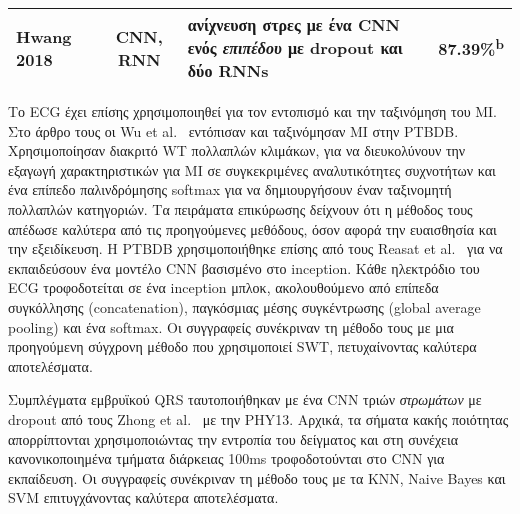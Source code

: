 \begin{sidewaystable}
\begin{tabular}{l c l l}
		Hwang 2018~\cite{hwang2018deep}        & CNN, RNN        & ανίχνευση στρες με ένα CNN  ενός \textit{επιπέδου} με dropout και δύο RNNs                   & 87.39\%\textsuperscript{b}                                                                                                                                                                                                                                                                                                                                                                                                                                                                                                                                                                                                                                                                                                                                                                                                                                                  \\
		\bottomrule
	\end{tabular}
\end{sidewaystable}

Το ECG έχει επίσης χρησιμοποιηθεί για τον εντοπισμό και την ταξινόμηση του ΜΙ.
Στο άρθρο τους οι Wu et al.~\cite{wu2016myocardial} εντόπισαν και ταξινόμησαν MI στην PTBDB\@.
Χρησιμοποίησαν διακριτό WT πολλαπλών κλιμάκων, για να διευκολύνουν την εξαγωγή χαρακτηριστικών για ΜΙ σε συγκεκριμένες αναλυτικότητες συχνοτήτων και ένα επίπεδο παλινδρόμησης softmax για να δημιουργήσουν έναν ταξινομητή πολλαπλών κατηγοριών.
Τα πειράματα επικύρωσης δείχνουν ότι η μέθοδος τους απέδωσε καλύτερα από τις προηγούμενες μεθόδους, όσον αφορά την ευαισθησία και την εξειδίκευση.
Η PTBDB χρησιμοποιήθηκε επίσης από τους Reasat et al.~\cite{reasat2017detection} για να εκπαιδεύσουν ένα μοντέλο CNN βασισμένο στο inception.
Κάθε ηλεκτρόδιο του ECG τροφοδοτείται σε ένα inception μπλοκ, ακολουθούμενο από επίπεδα συγκόλλησης (concatenation), παγκόσμιας μέσης συγκέντρωσης (global average pooling) και ένα softmax.
Οι συγγραφείς συνέκριναν τη μέθοδο τους με μια προηγούμενη σύγχρονη μέθοδο που χρησιμοποιεί SWT, πετυχαίνοντας καλύτερα αποτελέσματα.

Συμπλέγματα εμβρυϊκού QRS ταυτοποιήθηκαν με ένα CNN τριών \textit{στρωμάτων} με dropout από τους Zhong et al.~\cite{zhong2018deep} με την PHY13.
Αρχικά, τα σήματα κακής ποιότητας απορρίπτονται χρησιμοποιώντας την εντροπία του δείγματος και στη συνέχεια κανονικοποιημένα τμήματα διάρκειας 100ms τροφοδοτούνται στο CNN για εκπαίδευση.
Οι συγγραφείς συνέκριναν τη μέθοδο τους με τα KNN, Naive Bayes και SVM επιτυγχάνοντας καλύτερα αποτελέσματα.

